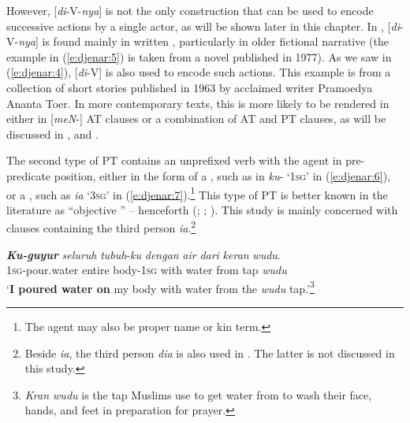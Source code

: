\documentclass[output=paper
,modfonts
,nonflat]{langsci/langscibook}
\begin{document}
\noindent
However, [\textit{di}-V-\textit{nya}] is not the only construction that can be used to encode successive actions by a single actor, as will be shown later in this chapter. In , [\textit{di}-V-\textit{nya}] is found mainly in written , particularly in older fictional narrative (the example in (\ref{e:djenar:5}) is taken from a novel published in 1977). As we saw in (\ref{e:djenar:4}), [\textit{di}-V] is also used to encode such actions. This example is from a collection of short stories published in 1963 by acclaimed writer Pramoedya Ananta Toer. In more contemporary texts, this is more likely to be rendered in either in [\textit{meN}-] AT clauses or a combination of AT and PT clauses, as will be discussed in ,  and . 

The second type of PT  contains an unprefixed verb with the agent in pre-predicate position, either in the form of a , such as in \textit{ku}- ‘\textsc{1sg}’ in (\ref{e:djenar:6}), or a , such as \textit{ia} ‘3\textsc{sg}’ in (\ref{e:djenar:7}).\footnote{The agent may also be proper name or kin term.}  This type of PT  is better known in the literature as “objective ” – henceforth  (\citealt{ArkaEtAl1998}; \citealt{ColeEtAl2008}; \citealt{Kroeger2014}). This study is mainly concerned with  clauses containing the third person  \textit{ia}.\footnote{Beside \textit{ia}, the third person  \textit{dia} is also used in . The latter is not discussed in this study.}

\begin{exe}
	\ex\label{e:djenar:6}
	\gll \textbf{\textit{Ku-guyur}} \textit{seluruh}   \textit{tubuh}-\textit{ku}     \textit{dengan} \textit{air}   \textit{dari}  \textit{keran}   \textit{wudu}.\\
	\textsc{1sg}-pour.water  entire    body-\textsc{1sg}    with water  from  tap  \textit{wudu}\\
	\glt ‘\textbf{I poured water on} my body with water from the \textit{wudu} tap.’\footnote{\textit{Kran wudu} is the tap Muslims use to get water from to wash their face, hands, and feet in preparation for prayer.}  \hfill \citep[12]{Kumalasari2006}
\end{exe}
\end{document}
